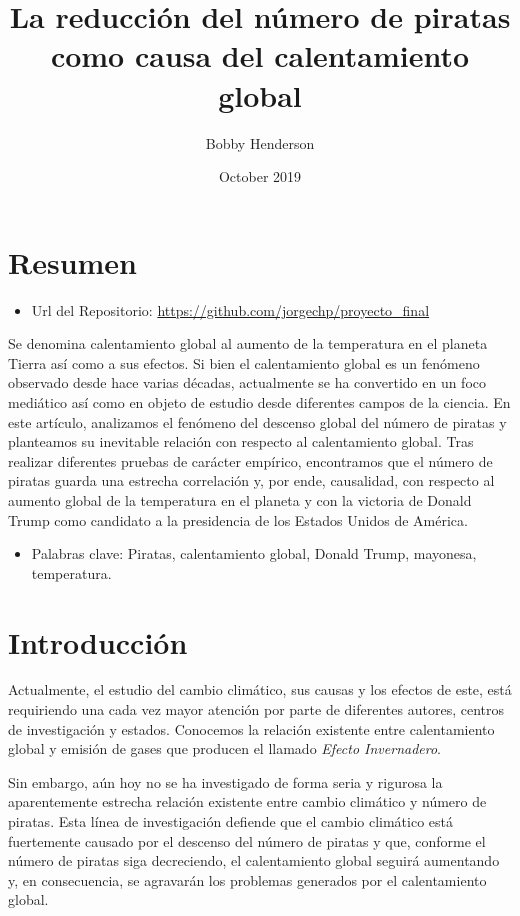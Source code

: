 \documentclass{article}
\title{La reducción del número de piratas como causa del calentamiento global}
\author{Bobby Henderson}
\date{October 2019}
\begin{document}
\maketitle

\section{Resumen}

\begin{itemize}
    \item Url del Repositorio: \url{https://github.com/jorgechp/proyecto_final}
\end{itemize}

Se denomina calentamiento global al aumento de la temperatura en el planeta Tierra así como a sus efectos. Si bien el calentamiento global es un fenómeno observado desde hace varias décadas, actualmente se ha convertido en un foco mediático así como en objeto de estudio desde diferentes campos de la ciencia. En este artículo, analizamos el fenómeno del descenso global del número de piratas y planteamos su inevitable relación con respecto al calentamiento global. Tras realizar diferentes pruebas de carácter empírico, encontramos que el número de piratas guarda una estrecha correlación y, por ende, causalidad, con respecto al aumento global de la temperatura en el planeta y con la victoria de Donald Trump como candidato a la presidencia de los Estados Unidos de América. 

\begin{itemize}
	\item Palabras clave: Piratas, calentamiento global, Donald Trump, mayonesa, temperatura.
\end{itemize}

\section{Introducción}

Actualmente, el estudio del cambio climático, sus causas y los efectos de este, está requiriendo una cada vez mayor atención por parte de diferentes autores, centros de investigación y estados. Conocemos la relación existente entre calentamiento global y emisión de gases que producen el llamado \emph{Efecto Invernadero}. 

Sin embargo, aún hoy no se ha investigado de forma seria y rigurosa la aparentemente estrecha relación existente entre cambio climático y número de piratas. Esta línea de investigación defiende que el cambio climático está fuertemente causado por el descenso del número de piratas y que, conforme el número de piratas siga decreciendo, el calentamiento global seguirá aumentando y, en consecuencia, se agravarán los problemas generados por el calentamiento global.
\end{document}
